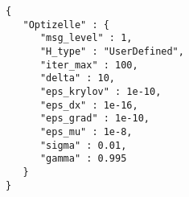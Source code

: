 \begin{lstlisting}[style=json,caption={Optizelle uses this input specification to minimize the constrained problem specified in Listing \ref{lst:simpleCon}.  We explain this specification Chapter \ref{ch:Input}.},label=lst:simpleConJSON]
{
   "Optizelle" : {
      "msg_level" : 1,
      "H_type" : "UserDefined",
      "iter_max" : 100,
      "delta" : 10,
      "eps_krylov" : 1e-10,
      "eps_dx" : 1e-16,
      "eps_grad" : 1e-10,
      "eps_mu" : 1e-8,
      "sigma" : 0.01,
      "gamma" : 0.995
   }
}
\end{lstlisting}
